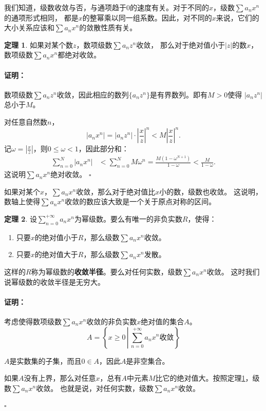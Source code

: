 \documentclass[12pt,UTF8]{ctexbook}
\theoremstyle{definition}
\newtheorem{tm}{定理}[section]
\theoremstyle{plain}
\renewenvironment{proof}{\paragraph{\textbf{证明：}}}{\hfill$\square$}
\begin{document}
\begin{appendix}
我们知道，级数收敛与否，与通项趋于$0$的速度有关。对于不同的$x$，级数$\sum a_n x^n$的通项形式相同，
都是$x$的整幂乘以同一组系数。因此，对不同的$x$来说，它们的大小关系应该和$\sum a_n x^n$的敛散性质有关。

\begin{tm}\label{tm:a-1-0}
    如果对某个数$z$，数项级数$\sum a_n z^n$收敛，
    那么对于绝对值小于$|z|$的数$x$，数项级数$\sum a_n x^n$都绝对收敛。
\end{tm}

\begin{proof}
    数项级数$\sum a_n z^n$收敛，因此相应的数列$\{a_n z^n\}$是有界数列。即有$M>0$使得
    $|a_n z^n|$总小于$M$。

    对任意自然数$n$，
    $$ |a_n x^n| = |a_n z^n| \cdot \left|\frac{x}{z}\right|^n < M \left|\frac{x}{z}\right|^n. $$
    记$\displaystyle \omega = \left|\frac{x}{z}\right|$，则$0\leqslant \omega<1$，因此部分和：
    \begin{align*}
        \sum_{n=0}^N |a_n x^n| &< \sum_{n=0}^N M \omega^n = \frac{M(1 - \omega^{N+1})}{1 - \omega} < \frac{M}{1 - \omega}.
    \end{align*}
    这说明$\sum a_n x^n$绝对收敛。
\end{proof}

如果对某个$x$，$\sum a_n x^n$收敛，那么对于绝对值比$x$小的数，级数也收敛。
这说明，数轴上使得$\sum a_n x^n$收敛的数应该大致是一个关于原点对称的区间。

\begin{tm}\label{tm:a-1-10}
    设$\displaystyle\sum_{n=0}^{+\infty} a_n x^n$为幂级数。要么有唯一的非负实数$R$，使得：
    \begin{enumerate}
        \item 只要$x$的绝对值小于$R$，那么级数$\sum a_n x^n$收敛。
        \item 只要$x$的绝对值大于$R$，那么级数$\sum a_n x^n$发散。
    \end{enumerate}
    这样的$R$称为幂级数的\textbf{收敛半径}。要么对任何实数，级数$\sum a_n x^n$收敛。
    这时我们说幂级数的收敛半径是无穷大。
\end{tm}

\begin{proof}
    考虑使得数项级数$\sum a_n x^n$收敛的非负实数$x$绝对值的集合$A$。
    $$A = \left\{ x \geqslant 0 \, \left| \, \sum_{n=0}^{+\infty} a_n x^n \mbox{收敛} \right. \right\} $$

    $A$是实数集的子集，而且$0\in A$，因此$A$是非空集合。

    如果$A$没有上界，那么对任意$x$，总有$A$中元素$M$比它的绝对值大。按照定理\ref{tm:a-1-0}，级数$\sum a_n x^n$收敛。
    也就是说，对任何实数，级数$\sum a_n x^n$收敛。


\end{proof}
\end{appendix}
\end{document}
